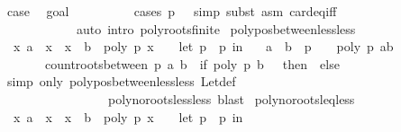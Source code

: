 \begin{isabellebody}
\ {\isacharquery}case\ \isamarkupfalse%
\ goal{}\isanewline
\ \ \ \ \ \ \ \ \isamarkupfalse%
\ {\isacharparenleft}cases\ {\isachardoublequoteopen}p\ {\isacharequal}\ {}{\isachardoublequoteclose}{\isacharcomma}\ simp{\isacharcomma}\ subst\ {\isacharparenleft}asm{\isacharparenright}\ card{\isacharunderscore}eq{\isacharunderscore}{}{\isacharunderscore}iff{\isacharcomma}\ \isanewline
\ \ \ \ \ \ \ \ \ \ \ \ auto\ intro{\isacharcolon}\ poly{\isacharunderscore}roots{\isacharunderscore}finite{\isacharparenright}\isanewline
{}\isamarkupfalse%
%
\endisatagproof
{\isafoldproof}%
%
\isadelimproof
\isanewline
%
\endisadelimproof
\isanewline
{}\isamarkupfalse%
\ poly{\isacharunderscore}pos{\isacharunderscore}between{\isacharunderscore}less{\isacharunderscore}less{\isacharcolon}\isanewline
\ \ {\isachardoublequoteopen}{\isacharparenleft}{\isasymforall}x{\isachardot}\ a\ {\isacharless}\ x\ {\isasymand}\ x\ {\isacharless}\ b\ {\isasymlongrightarrow}\ poly\ p\ x\ {\isachargreater}\ {}{\isacharparenright}\ {\isasymlongleftrightarrow}\ {\isacharparenleft}let\ p\ {\isacharequal}\ p\ in\isanewline
\ \ \ {\isacharparenleft}a\ {\isasymge}\ b\ {\isasymor}\ {\isacharparenleft}p\ {\isasymnoteq}\ {}\ {\isasymand}\ poly\ p\ {\isacharparenleft}{\isacharparenleft}a{\isacharplus}b{\isacharparenright}{\isacharslash}{}{\isacharparenright}\ {\isachargreater}\ {}\ {\isasymand}\ \isanewline
\ \ \ \ \ \ \ count{\isacharunderscore}roots{\isacharunderscore}between\ p\ a\ b\ {\isacharequal}\ {\isacharparenleft}if\ poly\ p\ b\ {\isacharequal}\ {}\ then\ {}\ else\ {}{\isacharparenright}{\isacharparenright}{\isacharparenright}{\isacharparenright}{\isachardoublequoteclose}\isanewline
%
\isadelimproof
\ \ %
\endisadelimproof
%
\isatagproof
{}\isamarkupfalse%
\ {\isacharparenleft}simp\ only{\isacharcolon}\ poly{\isacharunderscore}pos{\isacharunderscore}between{\isacharunderscore}less{\isacharunderscore}less\ Let{\isacharunderscore}def\ \isanewline
\ \ \ \ \ \ \ \ \ \ \ \ \ \ \ \ \ poly{\isacharunderscore}no{\isacharunderscore}roots{\isacharunderscore}less{\isacharunderscore}less{\isacharcomma}\ blast{\isacharparenright}%
\endisatagproof
{\isafoldproof}%
%
\isadelimproof
\isanewline
%
\endisadelimproof
\isanewline
{}\isamarkupfalse%
\ poly{\isacharunderscore}no{\isacharunderscore}roots{\isacharunderscore}leq{\isacharunderscore}less{\isacharcolon}\isanewline
\ \ {\isachardoublequoteopen}{\isacharparenleft}{\isasymforall}x{\isachardot}\ a\ {\isasymle}\ x\ {\isasymand}\ x\ {\isacharless}\ b\ {\isasymlongrightarrow}\ poly\ p\ x\ {\isasymnoteq}\ {}{\isacharparenright}\ {\isasymlongleftrightarrow}\ {\isacharparenleft}let\ p\ {\isacharequal}\ p\ in\isanewline

\end{isabellebody}
